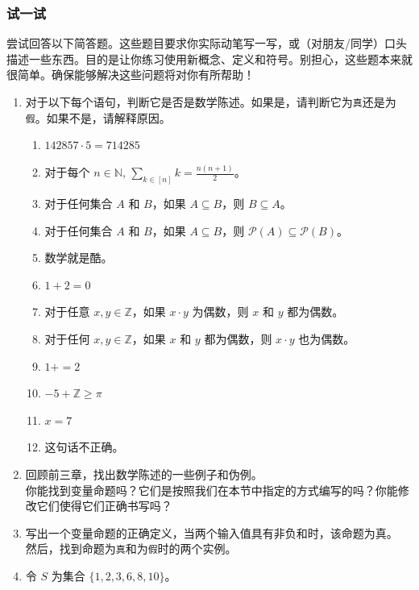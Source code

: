 \subsubsection*{试一试}

尝试回答以下简答题。这些题目要求你实际动笔写一写，或（对朋友/同学）口头描述一些东西。目的是让你练习使用新概念、定义和符号。别担心，这些题本来就很简单。确保能够解决这些问题将对你有所帮助！

\begin{enumerate}[label=(\arabic*)]
    \item 对于以下每个语句，判断它是否是数学陈述。如果是，请判断它为\verb|真|还是为\verb|假|。如果不是，请解释原因。
        \begin{enumerate}[label=(\alph*)]
            \item $142857 \cdot 5 = 714285$
            \item 对于每个 $n \in \mathbb{N}$, $\displaystyle{\sum_{k \in [n]}k=\frac{n(n+1)}{2}}$。
            \item 对于任何集合 $A$ 和 $B$，如果 $A \subseteq B$，则 $B \subseteq A$。
            \item 对于任何集合 $A$ 和 $B$，如果 $A \subseteq B$，则 $\mathcal{P}(A) \subseteq \mathcal{P}(B)$。
            \item 数学就是酷。
            \item $1 + 2 = 0$
            \item 对于任意 $x, y \in \mathbb{Z}$，如果 $x \cdot y$ 为偶数，则 $x$ 和 $y$ 都为偶数。
            \item 对于任何 $x, y \in \mathbb{Z}$，如果 $x$ 和 $y$ 都为偶数，则 $x \cdot y$ 也为偶数。
            \item $1+ = 2$
            \item $-5 + \mathbb{Z} \ge \pi$
            \item $x = 7$
            \item 这句话不正确。
        \end{enumerate}
    \item 回顾前三章，找出数学陈述的一些例子和伪例。\\
    你能找到变量命题吗？它们是按照我们在本节中指定的方式编写的吗？你能修改它们使得它们正确书写吗？
    \item 写出一个变量命题的正确定义，当两个输入值具有非负和时，该命题为真。\\
    然后，找到命题为\verb|真|和为\verb|假|时的两个实例。
    \item 令 $S$ 为集合 $\{1, 2, 3, 6, 8, 10\}$。
        \begin{enumerate}[label=(\alph*)]

\end{enumerate}
\end{enumerate}
